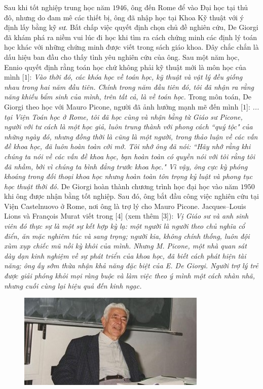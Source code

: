 \begin{multicols}{2}
	\vskip 0.1cm
	Sau khi tốt nghiệp trung học năm $1946$, ông đến Rome để vào Đại học tại thủ đô, nhưng do đam mê các thiết bị, ông đã nhập học tại Khoa Kỹ thuật với ý định lấy bằng kỹ sư. Bất chấp việc quyết định chọn chủ đề nghiên cứu, De Giorgi đã khám phá ra niềm vui lúc đi học khi tìm ra cách chứng minh các định lý toán học khác với những chứng minh được viết trong sách giáo khoa. Đây chắc chắn là dấu hiệu ban đầu cho thấy tình yêu nghiên cứu của ông. Sau một năm học, Ennio quyết định rằng toán học chứ không phải kỹ thuật mới là môn học của mình [$1$]:
	\vskip 0.1cm
	\textit{Vào thời đó, các khóa học về toán học, kỹ thuật và vật lý đều giống nhau trong hai năm đầu tiên. Chính trong năm đầu tiên đó, tôi đã nhận ra rằng năng khiếu bẩm sinh của mình, trên tất cả, là về toán học.}
	\vskip 0.1cm
	Trong môn toán, De Giorgi theo học với Mauro Picone, người đã ảnh hưởng mạnh mẽ đến mình [$1$]:
	\vskip 0.1cm
	\textit{... tại Viện Toán học ở Rome, tôi đã học cùng và nhận bằng từ Giáo sư Picone, người với tư cách là một học giả, luôn trung thành với phong cách ``quý tộc" của những ngày đó, nhưng đồng thời là cũng là một người, trong thảo luận về các vấn đề khoa học, đã luôn hoàn toàn cởi mở. Tôi nhớ ông đã nói: ``Hãy nhớ rằng khi chúng ta nói về các vấn đề khoa học, bạn hoàn toàn có quyền nói với tôi rằng tôi đã nhầm, bởi vì chúng ta bình đẳng trước khoa học." Vì vậy, ông cực kỳ phóng khoáng trong đối thoại khoa học nhưng hoàn toàn tôn trọng kỷ luật và phong tục học thuật thời đó.} 
	\vskip 0.1cm
	De Giorgi hoàn thành chương trình học đại học vào năm $1950$ khi ông được nhận bằng tốt nghiệp. Sau đó, ông bắt đầu công việc nghiên cứu tại Viện Castelnuovo ở Rome, nơi ông là trợ lý cho Mauro Picone. Jacques--Louis Lions và François Murat viết trong [$4$] (xem thêm [$3$]):
	\vskip 0.1cm
	\textit{Vị Giáo sư và anh sinh viên đó thực sự là một sự kết hợp kỳ lạ: một người là người theo chủ nghĩa cổ điển, ăn mặc nghiêm túc và sang trọng; người kia, không chính thống, luôn đội xùm xụp chiếc mũ nồi kỳ khôi của mình. Nhưng M. Picone, một nhà quan sát dày dạn kinh nghiệm về sự phát triển của khoa học, đã biết cách phát hiện tài năng; ông ấy sớm thừa nhận khả năng đặc biệt của E. De Giorgi. Người trợ lý trẻ được giải phóng khỏi mọi ràng buộc và làm việc theo ý mình một cách nhàn nhã, nhưng cuối cùng lại hiệu quả đến kinh ngạc.}
		\begin{figure}[H]
		\vspace*{-5pt}
		\centering
		\captionsetup{labelformat= empty, justification=centering}
		\includegraphics[width= 1\linewidth]{2}

\end{figure}
\end{multicols}
